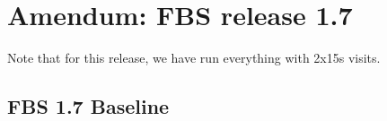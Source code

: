 
\section{Amendum: FBS release 1.7}

Note that for this release, we have run everything with 2x15s visits.


\subsection{FBS 1.7 Baseline}


